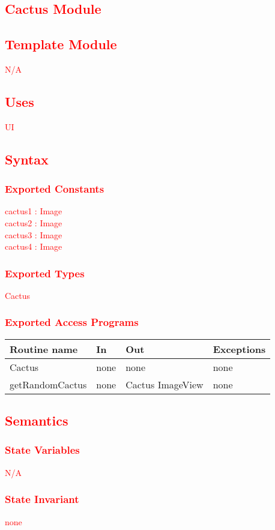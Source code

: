 \documentclass[12pt, titlepage]{article}
\begin{document}
\textcolor{red}{
\section {Cactus Module}
\subsection{Template Module}
N/A
\subsection {Uses}
UI
\subsection {Syntax}
\subsubsection{Exported Constants}
cactus1 : Image \\
cactus2 : Image \\
cactus3 : Image \\
cactus4 : Image \\
\subsubsection {Exported Types}
Cactus
\subsubsection {Exported Access Programs}
\begin{tabular}{| l | l | l | l |}
\hline
\textbf{Routine name} & \textbf{In} & \textbf{Out} & \textbf{Exceptions}\\
\hline
Cactus & none & none & none\\
\hline
getRandomCactus & none & Cactus ImageView & none\\
\hline
\end{tabular}
\subsection {Semantics}
\subsubsection {State Variables}
N/A
\subsubsection {State Invariant}
none
}
\end{document}

